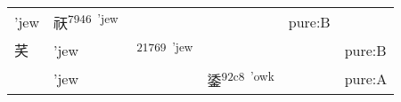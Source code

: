 \documentclass[14pt,a4paper]{scrartcl}
\begin{document}
\begin{longtable}[c]{@{}llllll@{}}
\begin{minipage}[t]{0.14\columnwidth}\raggedright\strut
'jew
\strut\end{minipage} &
\begin{minipage}[t]{0.14\columnwidth}\raggedright\strut
祆\textsuperscript{7946~'jew}
\strut\end{minipage} &
\begin{minipage}[t]{0.14\columnwidth}\raggedright\strut
\strut\end{minipage} &
\begin{minipage}[t]{0.14\columnwidth}\raggedright\strut
\strut\end{minipage} &
\begin{minipage}[t]{0.14\columnwidth}\raggedright\strut
pure:B
\strut\end{minipage}\tabularnewline
\begin{minipage}[t]{0.14\columnwidth}\raggedright\strut
芺
\strut\end{minipage} &
\begin{minipage}[t]{0.14\columnwidth}\raggedright\strut
'jew
\strut\end{minipage} &
\begin{minipage}[t]{0.14\columnwidth}\raggedright\strut
𡝩\textsuperscript{21769~'jew}
\strut\end{minipage} &
\begin{minipage}[t]{0.14\columnwidth}\raggedright\strut
\strut\end{minipage} &
\begin{minipage}[t]{0.14\columnwidth}\raggedright\strut
\strut\end{minipage} &
\begin{minipage}[t]{0.14\columnwidth}\raggedright\strut
pure:B
\strut\end{minipage}\tabularnewline
\begin{minipage}[t]{0.14\columnwidth}\raggedright\strut
𣵽
\strut\end{minipage} &
\begin{minipage}[t]{0.14\columnwidth}\raggedright\strut
'jew
\strut\end{minipage} &
\begin{minipage}[t]{0.14\columnwidth}\raggedright\strut
\strut\end{minipage} &
\begin{minipage}[t]{0.14\columnwidth}\raggedright\strut
鋈\textsuperscript{92c8~'owk}
\strut\end{minipage} &
\begin{minipage}[t]{0.14\columnwidth}\raggedright\strut
\strut\end{minipage} &
\begin{minipage}[t]{0.14\columnwidth}\raggedright\strut
pure:A
\strut\end{minipage}\tabularnewline
\bottomrule
\end{longtable}
\end{document}
